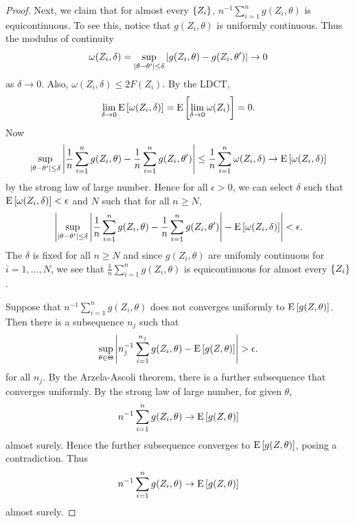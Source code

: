 \begin{proof}
    Next, we claim that for almost every $\left\{ {Z_i} \right\}$, 
    $n^{-1}\sum_{i=1}^ng(Z_i,\theta)$ is equicontinuous. To see this, 
    notice that $g(Z_i,\theta)$ is uniformly continuous. Thus the 
    modulus of continuity 
    \begin{equation*}
        \omega(Z_i,\delta) = \sup_{\left\lvert {\theta - \theta'} \right\rvert\leq\delta}\left\lvert {g(Z_i,\theta) - g(Z_i,\theta')} \right\rvert\to 0
    \end{equation*}
    as $\delta\to 0$. Also, $\omega(Z_i,\delta)\leq 2F(Z_i)$. By the LDCT, 
    \begin{equation*}
        \lim_{\delta\to 0}\operatorname{E}\left[ {\omega(Z_i,\delta)} \right] = \operatorname{E}\left[ {\lim_{\delta\to 0}\omega(Z_i)} \right] = 0. 
    \end{equation*}
    Now 
    \begin{equation*}
        \sup_{\left\lvert {\theta - \theta'} \right\rvert\leq \delta}\left\lvert {\frac{1}{n}\sum_{i=1}^ng(Z_i,\theta) - \frac{1}{n}\sum_{i=1}^ng(Z_i,\theta')} \right\rvert 
        \leq \frac{1}{n}\sum_{i=1}^n\omega(Z_i,\delta)\to\operatorname{E}\left[ {\omega(Z_i,\delta)} \right]
    \end{equation*}
    by the strong law of large number. Hence for all $\epsilon>0$, 
    we can select $\delta$ such that $\operatorname{E}\left[ {\omega(Z_i,\delta)} \right]<\epsilon$ 
    and $N$ such that for all $n\geq N$, 
    \begin{equation*}
        \left\lvert {\sup_{\left\lvert {\theta - \theta'} \right\rvert\leq \delta}\left\lvert {\frac{1}{n}\sum_{i=1}^ng(Z_i,\theta) - \frac{1}{n}\sum_{i=1}^ng(Z_i,\theta')} \right\rvert - \operatorname{E}\left[ {\omega(Z_i,\delta)} \right]} \right\rvert < \epsilon. 
    \end{equation*}
    The $\delta$ is fixed for all $n\geq N$ and since $g(Z_i,\theta)$ are unifomly 
    continuous for $i = 1,\ldots,N$, we see that $\frac{1}{n}\sum_{i=1}^ng(Z_i,\theta)$ 
    is equicontinuous for almost every $\left\{ {Z_i} \right\}$. 

    Suppose that $n^{-1}\sum_{i=1}^ng(Z_i,\theta)$ does not converges 
    uniformly to $\operatorname{E}\left[ {g(Z,\theta)} \right]$. Then there is a subsequence 
    $n_j$ such that 
    \begin{equation*}
        \sup_{\theta\in\Theta}\left\lvert {n_j^{-1}\sum_{i=1}^{n_j}g(Z_i,\theta) - \operatorname{E}\left[ {g(Z,\theta)} \right]} \right\rvert > \epsilon. 
    \end{equation*}
    for all $n_j$. By the Arzela-Ascoli theorem, there is a further 
    subsequence that converges uniformly. By the strong law of large number, 
    for given $\theta$, 
    \begin{equation*}
        n^{-1}\sum_{i=1}^ng(Z_i,\theta)\to \operatorname{E}\left[ {g(Z,\theta)} \right]
    \end{equation*}
    almost surely. Hence the further subsequence converges to $\operatorname{E}\left[ {g(Z,\theta)} \right]$, 
    posing a contradiction. Thus 
    \begin{equation*}
        n^{-1}\sum_{i=1}^ng(Z_i,\theta) \to \operatorname{E}\left[ {g(Z,\theta)} \right]
    \end{equation*}
    almost surely.
\end{proof}